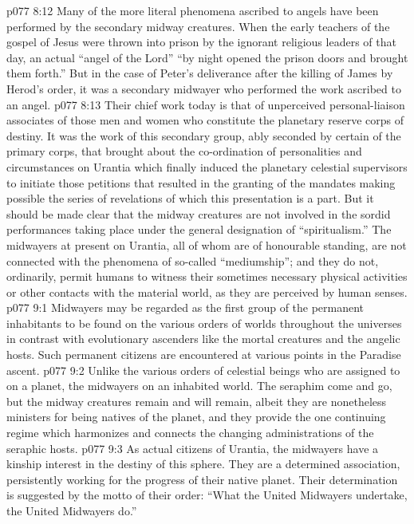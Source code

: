 \vs p077 8:12 Many of the more literal phenomena ascribed to angels have been performed by the secondary midway creatures. When the early teachers of the gospel of Jesus were thrown into prison by the ignorant religious leaders of that day, an actual “angel of the Lord” “by night opened the prison doors and brought them forth.” But in the case of Peter’s deliverance after the killing of James by Herod’s order, it was a secondary midwayer who performed the work ascribed to an angel.
\vs p077 8:13 Their chief work today is that of unperceived personal\hyp{}liaison associates of those men and women who constitute the planetary reserve corps of destiny. It was the work of this secondary group, ably seconded by certain of the primary corps, that brought about the co\hyp{}ordination of personalities and circumstances on Urantia which finally induced the planetary celestial supervisors to initiate those petitions that resulted in the granting of the mandates making possible the series of revelations of which this presentation is a part. But it should be made clear that the midway creatures are not involved in the sordid performances taking place under the general designation of “spiritualism.” The midwayers at present on Urantia, all of whom are of honourable standing, are not connected with the phenomena of so\hyp{}called “mediumship”; and they do not, ordinarily, permit humans to witness their sometimes necessary physical activities or other contacts with the material world, as they are perceived by human senses.
\vs p077 9:1 Midwayers may be regarded as the first group of the permanent inhabitants to be found on the various orders of worlds throughout the universes in contrast with evolutionary ascenders like the mortal creatures and the angelic hosts. Such permanent citizens are encountered at various points in the Paradise ascent.
\vs p077 9:2 Unlike the various orders of celestial beings who are assigned to  on a planet, the midwayers  on an inhabited world. The seraphim come and go, but the midway creatures remain and will remain, albeit they are nonetheless ministers for being natives of the planet, and they provide the one continuing regime which harmonizes and connects the changing administrations of the seraphic hosts.
\vs p077 9:3 As actual citizens of Urantia, the midwayers have a kinship interest in the destiny of this sphere. They are a determined association, persistently working for the progress of their native planet. Their determination is suggested by the motto of their order: “What the United Midwayers undertake, the United Midwayers do.”

